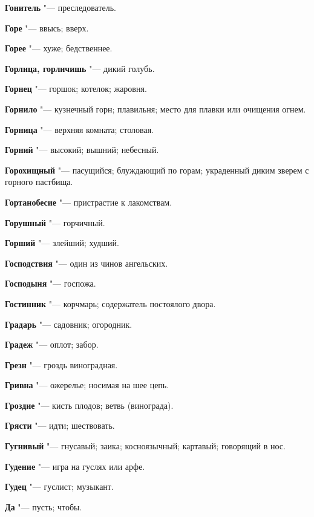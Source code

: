 \begin{mymulticols}
\noindent\textbf{Гонитель} "--- преследователь. 

\noindent\textbf{Горе} "--- ввысь; вверх. 

\noindent\textbf{Горее} "--- хуже; бедственнее. 

\noindent\textbf{Горлица, горличишь} "--- дикий голубь. 

\noindent\textbf{Горнец} "--- горшок; котелок; жаровня. 

\noindent\textbf{Горнило} "--- кузнечный горн; плавильня; место для плавки или очищения огнем. 

\noindent\textbf{Горница} "--- верхняя комната; столовая. 

\noindent\textbf{Горний} "--- высокий; вышний; небесный. 

\noindent\textbf{Горохищный} "--- пасущийся; блуждающий по горам; украденный диким зверем с горного пастбища. 

\noindent\textbf{Гортанобесие} "--- пристрастие к лакомствам. 

\noindent\textbf{Горушный} "--- горчичный. 

\noindent\textbf{Горший} "--- злейший; худший. 

\noindent\textbf{Господствия} "--- один из чинов ангельских. 

\noindent\textbf{Господыня} "--- госпожа. 

\noindent\textbf{Гостинник} "--- корчмарь; содержатель постоялого двора. 

\noindent\textbf{Градарь} "--- садовник; огородник. 

\noindent\textbf{Градеж} "--- оплот; забор. 

\noindent\textbf{Грезн} "--- гроздь виноградная. 

\noindent\textbf{Гривна} "--- ожерелье; носимая на шее цепь. 

\noindent\textbf{Гроздие} "--- кисть плодов; ветвь (винограда). 

\noindent\textbf{Грясти} "--- идти; шествовать. 

\noindent\textbf{Гугнивый} "--- гнусавый; заика; косноязычный; картавый; говорящий в нос. 

\noindent\textbf{Гудение} "--- игра на гуслях или арфе. 

\noindent\textbf{Гудец} "--- гуслист; музыкант. 

\bukvaending


\noindent\textbf{Да} "--- пусть; чтобы. 


\end{mymulticols}
